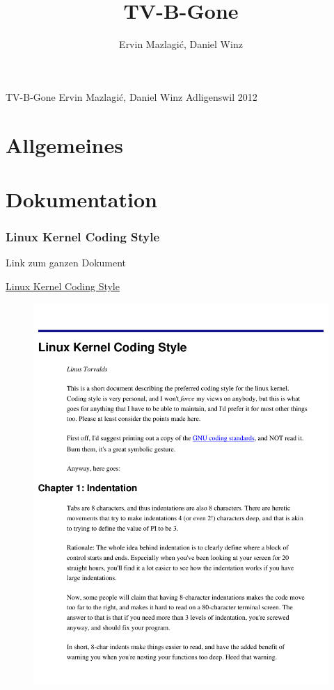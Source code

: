 \documentclass[a4paper,
               10pt,
               fleqn]{article}
\author{Ervin Mazlagi\'c, Daniel Winz}
\title{TV-B-Gone}
\begin{document}
         {TV-B-Gone}
         {Ervin Mazlagi\'c, Daniel Winz}
         {Adligenswil}
         {2012}

\tableofcontents
\newpage



\part{Allgemeines}





\part{Dokumentation}



\begin{appendix}
    \clearpage
    \newpage

    \section{Linux Kernel Coding Style}
    Link zum ganzen Dokument 

    \href{https://computing.llnl.gov/linux/slurm/coding_style.pdf}{
        Linux Kernel Coding Style}
    \begin{figure}[h!]
    \includegraphics[page=1, width=1\textwidth]{kernelstyle.pdf}
    \end{figure}
    \newpage


\end{appendix}
\end{document}
